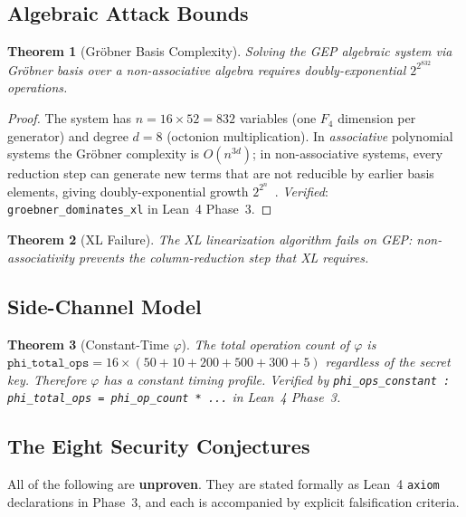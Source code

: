 \documentclass[11pt,letterpaper]{article}
\newtheorem{theorem}{Theorem}[section]
\theoremstyle{definition}
\begin{document}
\subsection{Algebraic Attack Bounds}

\begin{theorem}[Gr\"obner Basis Complexity]
Solving the GEP algebraic system via Gr\"obner basis over a non-associative
algebra requires doubly-exponential $2^{2^{832}}$ operations.
\end{theorem}
\begin{proof}
The system has $n = 16 \times 52 = 832$ variables (one $F_4$ dimension per
generator) and degree $d = 8$ (octonion multiplication).
In \emph{associative} polynomial systems the Gr\"obner complexity is
$O(n^{3d})$; in non-associative systems, every reduction step can generate new
terms that are not reducible by earlier basis elements, giving doubly-exponential
growth $2^{2^n}$~\cite{shirshov1962}.
\textit{Verified}: \texttt{groebner\_dominates\_xl} in Lean~4 Phase~3.
\end{proof}

\begin{theorem}[XL Failure]
The XL linearization algorithm fails on GEP: non-associativity prevents the
column-reduction step that XL requires.
\end{theorem}

\subsection{Side-Channel Model}

\begin{theorem}[Constant-Time $\varphi$]
The total operation count of $\varphi$ is $\mathtt{phi\_total\_ops} =
16 \times (50 + 10 + 200 + 500 + 300 + 5)$ regardless of the secret key.
Therefore $\varphi$ has a constant timing profile.
\textit{Verified by} \texttt{phi\_ops\_constant : phi\_total\_ops = phi\_op\_count * ...}
\textit{in Lean~4 Phase~3}.
\end{theorem}

\subsection{The Eight Security Conjectures}
\label{sec:conjectures}

All of the following are \textbf{unproven}.  They are stated formally as
Lean~4 \texttt{axiom} declarations in Phase~3, and each is accompanied by
explicit falsification criteria.
\end{document}
